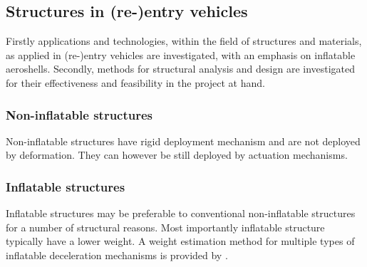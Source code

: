 \subsection{Structures in (re-)entry vehicles}\label{sec:struc}
Firstly applications and technologies, within the field of structures and materials, as applied in (re-)entry vehicles are investigated, with an emphasis on inflatable aeroshells. Secondly, methods for structural analysis and design are investigated for their effectiveness and feasibility in the project at hand.

\subsubsection{Non-inflatable structures}
Non-inflatable structures have rigid deployment mechanism and are not deployed by deformation. They can however be still deployed by actuation mechanisms. 

\subsubsection{Inflatable structures}
Inflatable structures may be preferable to conventional non-inflatable structures for a number of structural reasons. Most importantly inflatable structure typically have a lower weight. A weight estimation method for multiple types of inflatable deceleration mechanisms is provided by \cite{Samareh2011}.






